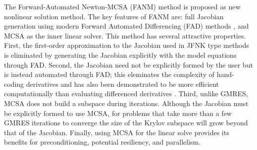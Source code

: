 The Forward-Automated Newton-MCSA (FANM) method is proposed as new
nonlinear solution method. The key features of FANM are: full Jacobian
generation using modern Forward Automated Differencing (FAD) methods
\cite{bartlett_2006}, and MCSA as the inner linear solver. This method
has several attractive properties. First, the first-order
approximation to the Jacobian used in JFNK type methods is eliminated
by generating the Jacobian explicitly with the model equations through
FAD. Second, the Jacobian need not be explicitly formed by the user
but is instead automated through FAD; this eleminates the complexity
of hand-coding derivatives and has also been demonstrated to be more
efficient computationally than evaluating differenced derivatives
\cite{bartlett_2006}. Third, unlike GMRES, MCSA does not build a
subspace during iterations. Although the Jacobian must be explicitly
formed to use MCSA, for problems that take more than a few GMRES
iterations to converge the size of the Krylov subspace will grow
beyond that of the Jacobian. Finally, using MCSA for the linear solve
provides its benefits for preconditioning, potential resiliency, and
parallelism.

